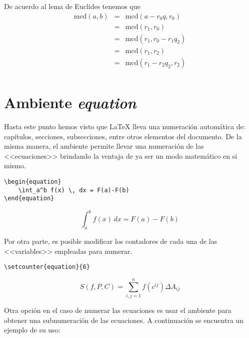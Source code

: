 \documentclass[a4,10pt]{aleph-notas}
\theoremstyle{definition}
\theoremstyle{plain}
\begin{document}
De acuerdo al lema de Euclides tenemos que
\begin{eqnarray*} %
\mbox{mcd}(a,b) & = & \mbox{mcd}(a-r_0q,r_0) \\[0.2cm]
& = & \mbox{mcd}(r_1,r_0) \\[0.2cm]
& = & \mbox{mcd}(r_1,r_0-r_1q_2)\\[0.2cm]
& = & \mbox{mcd}(r_1,r_2) \\[0.2cm]
& = & \mbox{mcd}(r_1-r_2q_2,r_2)\\[0.2cm]
\end{eqnarray*}

\section{Ambiente \emph{equation}}

Hasta este punto hemos visto que \LaTeX{} lleva una numeración automática de: capítulos, secciones, subsecciones, entre otros elementos del documento. De la misma manera, el ambiente \verb@equation@ permite llevar una numeración de las <<ecuaciones>> brindando la ventaja de ya ser un modo matemático en si mismo.

\begin{lstlisting}[frame=single]
\begin{equation}
    \int_a^b f(x) \, dx = F(a)-F(b)
\end{equation}
\end{lstlisting}

\begin{equation}
    \int_a^b f(x) \, dx = F(a)-F(b)
\end{equation}

Por otra parte, es posible modificar los contadores de cada una de las <<variables>> empleadas para numerar.

\begin{lstlisting}[frame=single]
\setcounter{equation}{6}
\end{lstlisting}

\setcounter{equation}{6}

\begin{equation}
    S(f,P,C) = \sum_{i,j=1}^n f(c^{ij})\Delta A_{ij}
\end{equation}

Otra opción en el caso de numerar las ecuaciones es usar el ambiente \verb@subequations@ para obtener una subnumeración de las ecuaciones. A continuación se encuentra un ejemplo de su uso:
\end{document}
